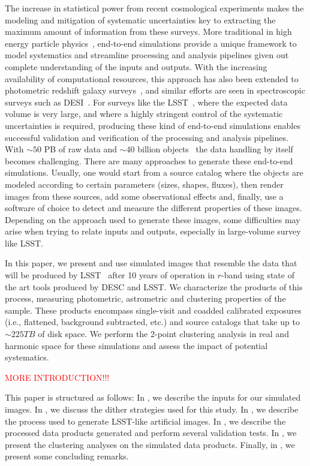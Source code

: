 \documentclass[twocolumn]{aastex62}
\begin{document}
The increase in statistical power from recent cosmological experiments makes the modeling and mitigation of systematic uncertainties key to extracting the maximum amount of information from these surveys. More traditional in high energy particle physics~\citep{Brun:118715, 2006JHEP...05..026S}, end-to-end simulations provide a unique framework to
model systematics and streamline processing and analysis pipelines given out complete understanding of the inputs and outputs. With the increasing availability of computational resources, this approach has also been extended to photometric redshift galaxy surveys~\citep{2016MNRAS.457..786S,2016ApJ...817...25B}, and similar efforts are seen in spectroscopic surveys such as DESI~\citep{2016arXiv161100036D}. For surveys like the LSST~\citep{Overview}, where the expected data volume is very large, and where a highly stringent control of the systematic uncertainties is required, producing these
kind of end-to-end simulations enables successful validation and verification of the processing and analysis pipelines. With $\sim 50$ PB of raw data and $\sim 40$ billion objects~\citep{Overview} the data handling by itself becomes challenging. There are many approaches to generate these end-to-end simulations. Usually, one would start from a source catalog where the objects are modeled according to certain parameters (sizes, shapes, fluxes), then render images from these sources, add some observational effects and, finally, use a software of choice to detect and measure the different properties of these images. Depending on the approach used to generate these images, some difficulties may arise when trying to relate inputs and outputs, especially in large-volume survey like LSST.

In this paper, we present and use simulated images that resemble the data that will be produced by
LSST~\citep{Overview} after 10 years of operation in $r$-band using state of the art tools produced by DESC and LSST. We characterize the products of this process, measuring photometric, astrometric and clustering properties of the sample. These products encompass single-visit and coadded calibrated exposures (i.e., flattened, background subtracted, etc.) and source catalogs that take up to $\sim 225 TB$ of disk space. We perform the 2-point clustering analysis in real and harmonic space for these simulations and assess the impact of potential systematics.

\textcolor{red}{MORE INTRODUCTION!!!}

This paper is structured as follows: In , we describe the inputs for our simulated images. In , we discuss the dither strategies used for this study. In , we describe the process used to generate LSST-like artificial images. In , we describe the processed data products generated and perform several validation tests. In , we present the clustering analyses on the simulated data products. Finally, in , we present some concluding remarks.
\end{document}
